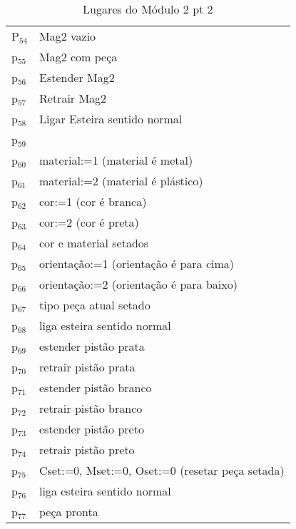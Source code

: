\documentclass[11pt]{article}
\begin{document}
\begin{table}[htb]
\caption{Lugares do Módulo 2 pt 2}
\centering
\begin{tabular}{ll}
P$_{\text{54}}$ & Mag2 vazio\\
p$_{\text{55}}$ & Mag2 com peça\\
p$_{\text{56}}$ & Estender Mag2\\
p$_{\text{57}}$ & Retrair Mag2\\
p$_{\text{58}}$ & Ligar Esteira sentido normal\\
p$_{\text{59}}$ & \\
p$_{\text{60}}$ & material:=1 (material é metal)\\
p$_{\text{61}}$ & material:=2 (material é plástico)\\
p$_{\text{62}}$ & cor:=1 (cor é branca)\\
p$_{\text{63}}$ & cor:=2 (cor é preta)\\
p$_{\text{64}}$ & cor e material setados\\
p$_{\text{65}}$ & orientação:=1 (orientação é para cima)\\
p$_{\text{66}}$ & orientação:=2 (orientação é para baixo)\\
p$_{\text{67}}$ & tipo peça atual setado\\
p$_{\text{68}}$ & liga esteira sentido normal\\
p$_{\text{69}}$ & estender pistão prata\\
p$_{\text{70}}$ & retrair pistão prata\\
p$_{\text{71}}$ & estender pistão branco\\
p$_{\text{72}}$ & retrair pistão branco\\
p$_{\text{73}}$ & estender pistão preto\\
p$_{\text{74}}$ & retrair pistão preto\\
p$_{\text{75}}$ & Cset:=0, Mset:=0, Oset:=0 (resetar peça setada)\\
p$_{\text{76}}$ & liga esteira sentido normal\\
p$_{\text{77}}$ & peça pronta\\
\end{tabular}
\end{table}
\end{document}
